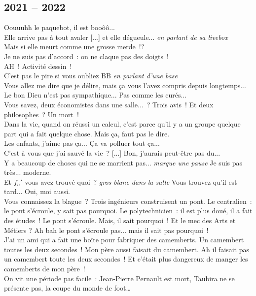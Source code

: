 \documentclass[french, a4paper, openany]{book}
\begin{document}
	\subsection*{2021 -- 2022}
		\noindent \og Oouuuhh le paquebot, il est booôô... \fg \\
		\og Elle arrive pas à tout avaler [...] et elle dégueule... \fg \emph{en parlant de sa livebox} \\
		\og Mais si elle meurt comme une grosse merde~!? \fg \\
		\og Je ne suis pas d'accord~: on ne claque pas des doigts~! \fg \\
		\og AH~! Activité dessin~! \fg \\
		\og C'est pas le pire si vous oubliez BB \fg \emph{en parlant d'une base} \\
		\og Vous allez me dire que je délire, mais ça vous l'avez compris depuis longtemps... \fg \\
		\og Le bon Dieu n'est pas sympathique... Pas comme les curés... \fg \\
		\og Vous savez, deux économistes dans une salle...~? Trois avis~! Et deux philosophes~? Un mort~! \fg \\
		\og Dans la vie, quand on réussi un calcul, c'est parce qu'il y a un groupe quelque part qui a fait quelque chose. Mais ça, faut pas le dire. \fg \\
		\og Les enfants, j'aime pas ça... Ça va polluer tout ça... \fg \\
		\og C'est à vous que j'ai sauvé la vie~? [...] Bon, j'aurais peut-être pas du... \fg \\
		\og Y a beaucoup de choses qui ne se marrient pas... \emph{marque une pause} Je suis pas très... moderne. \fg \\
		\og Et $f_n'$ vous avez trouvé quoi~? \emph{gros blanc dans la salle} Vous trouvez qu'il est tard... Oui, moi aussi. \fg \\
		\og Vous connaissez la blague~? Trois ingénieurs construisent un pont. Le centralien~: le pont s'écroule, y sait pas pourquoi. Le polytechnicien~: il est plus doué, il a fait des études~! Le pont s'écroule. Mais, il sait pourquoi~! Et le mec des Arts et Métiers ? Ah bah le pont s'écroule pas... mais il sait pas pourquoi~! \fg \\
		\og J'ai un ami qui a fait une boîte pour fabriquer des camemberts. Un camembert toutes les deux secondes~! Mon père aussi faisait du camembert. Ah il faisait pas un camembert toute les deux secondes~! Et c'était plus dangereux de manger les camemberts de mon père~! \fg \\
		\og On vit une période pas facile~: Jean-Pierre Pernault est mort, Taubira ne se présente pas, la coupe du monde de foot… \fg \\
		
\end{document}
